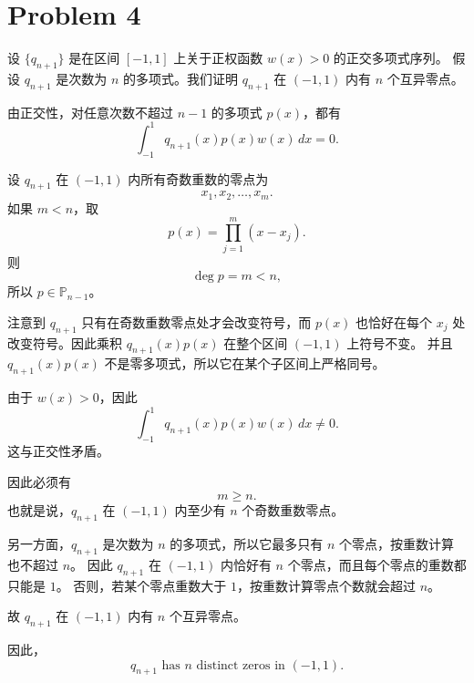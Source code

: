 \documentclass{ctexart}
\begin{document}
\section{Problem 4}
\begin{solution}
  设 $\{q_{n+1}\}$ 是在区间 $[-1,1]$ 上关于正权函数 $w(x)>0$ 的正交多项式序列。
  假设 $q_{n+1}$ 是次数为 $n$ 的多项式。我们证明 $q_{n+1}$ 在 $(-1,1)$ 内有 $n$ 个互异零点。

  由正交性，对任意次数不超过 $n-1$ 的多项式 $p(x)$，都有
  \[
    \int_{-1}^1 q_{n+1}(x)p(x)w(x)\,dx=0.
  \]

  设 $q_{n+1}$ 在 $(-1,1)$ 内所有奇数重数的零点为
  \[
    x_1,x_2,\ldots,x_m.
  \]
  如果 $m<n$，取
  \[
    p(x)=\prod_{j=1}^m (x-x_j).
  \]
  则
  \[
    \deg p=m<n,
  \]
  所以 $p\in \mathbb{P}_{n-1}$。

  注意到 $q_{n+1}$ 只有在奇数重数零点处才会改变符号，而 $p(x)$ 也恰好在每个
  $x_j$ 处改变符号。因此乘积 $q_{n+1}(x)p(x)$ 在整个区间 $(-1,1)$ 上符号不变。
  并且 $q_{n+1}(x)p(x)$ 不是零多项式，所以它在某个子区间上严格同号。

  由于 $w(x)>0$，因此
  \[
    \int_{-1}^1 q_{n+1}(x)p(x)w(x)\,dx \ne 0.
  \]
  这与正交性矛盾。

  因此必须有
  \[
    m\ge n.
  \]
  也就是说，$q_{n+1}$ 在 $(-1,1)$ 内至少有 $n$ 个奇数重数零点。

  另一方面，$q_{n+1}$ 是次数为 $n$ 的多项式，所以它最多只有 $n$ 个零点，按重数计算也不超过 $n$。
  因此 $q_{n+1}$ 在 $(-1,1)$ 内恰好有 $n$ 个零点，而且每个零点的重数都只能是 $1$。
  否则，若某个零点重数大于 $1$，按重数计算零点个数就会超过 $n$。

  故 $q_{n+1}$ 在 $(-1,1)$ 内有 $n$ 个互异零点。

  因此，
  \[
    q_{n+1} \text{ has } n \text{ distinct zeros in } (-1,1).
  \]

\end{solution}
\end{document}
